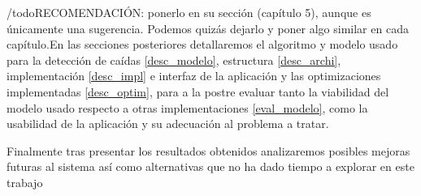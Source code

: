 \documentclass[../tfm.tex]{subfiles}
\begin{document}
/todo{RECOMENDACIÓN: ponerlo en su sección (capítulo 5), aunque es únicamente una sugerencia. Podemos quizás dejarlo y poner algo similar en cada capítulo.}En las secciones posteriores detallaremos el algoritmo y modelo usado para la detección de caídas \ref{desc_modelo}, estructura \ref{desc_archi}, implementación \ref{desc_impl} e interfaz de la aplicación y las optimizaciones implementadas \ref{desc_optim}, para a la postre evaluar tanto la viabilidad del modelo usado respecto a otras implementaciones \ref{eval_modelo}, como la usabilidad de la aplicación y su adecuación al problema a tratar.

Finalmente tras presentar los resultados obtenidos analizaremos posibles mejoras futuras al sistema así como alternativas que no ha dado tiempo a explorar en este trabajo
\end{document}

